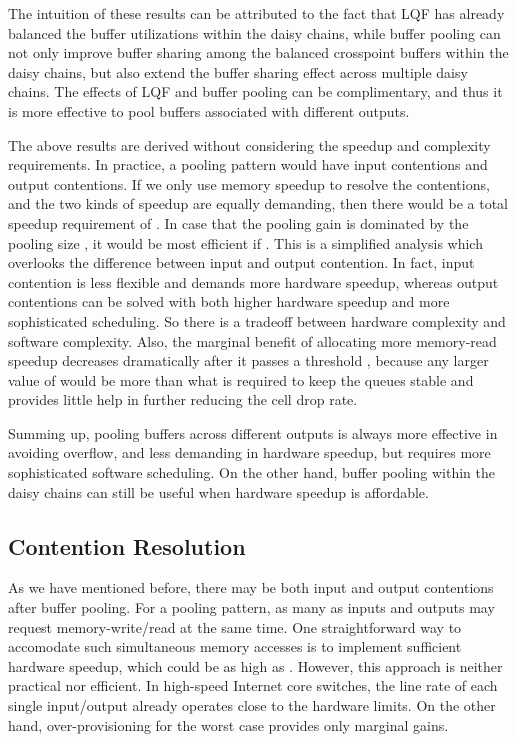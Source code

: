 \documentclass[journal,final,doublecolumn,10pt,twoside]{IEEEtranTCOM} \normalsize
\begin{document}
The intuition of these results can be attributed to the fact that LQF has already balanced the buffer utilizations within the daisy chains, while buffer pooling can not only improve buffer sharing among the balanced crosspoint buffers within the daisy chains, but also extend the buffer sharing effect across multiple daisy chains. The effects of LQF and buffer pooling can be complimentary, and thus it is more effective to pool buffers associated with different outputs.





The above results are derived without considering the speedup and complexity requirements. In practice, a  pooling pattern would have  input contentions and  output contentions. If we only use memory speedup to resolve the contentions, and the two kinds of speedup are equally demanding, then there would be a total speedup requirement of . 
In case that the pooling gain is dominated by the pooling size , it would be most efficient if . 
This is a simplified analysis which overlooks the difference between input and output contention. In fact, input contention is less flexible and demands more hardware speedup, whereas output contentions can be solved with both higher hardware speedup and more sophisticated scheduling. So there is a tradeoff between hardware complexity and software complexity. Also, the marginal benefit of allocating more memory-read speedup  decreases dramatically after it passes a threshold , because any larger value of  would be more than what is required to keep the queues stable and provides little help in further reducing the cell drop rate.

Summing up, pooling buffers across different outputs is always more effective in avoiding overflow, and less demanding in hardware speedup, but requires more sophisticated software scheduling. On the other hand, buffer pooling within the daisy chains can still be useful when hardware speedup is affordable.






\subsection{Contention Resolution}
\label{sec:contention}
As we have mentioned before, there may be both input and output contentions after buffer pooling. For a  pooling pattern, as many as  inputs and  outputs may request memory-write/read at the same time. One straightforward way to accomodate such simultaneous memory accesses is to implement sufficient hardware speedup, which could be as high as . However, this approach is neither practical nor efficient. In high-speed Internet core switches, the line rate of each single input/output already operates close to the hardware limits. On the other hand,  over-provisioning for the worst case provides only marginal gains.
\end{document}

